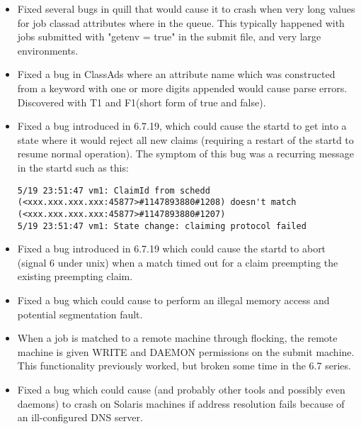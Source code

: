\begin{itemize}

\item Fixed several bugs in quill that would cause it to crash when
very long values for job classad attributes where in the queue.  This
typically happened with jobs submitted with "getenv = true" in the
submit file, and very large environments.

\item Fixed a bug in ClassAds where an attribute name which was
constructed from a keyword with one or more digits appended would
cause parse errors. Discovered with T1 and F1(short form of true
and false).

\item Fixed a bug introduced in 6.7.19, which could cause the startd
to get into a state where it would reject all new claims (requiring a
restart of the startd to resume normal operation).  The symptom of
this bug was a recurring message in the startd such as this:

\begin{verbatim}
5/19 23:51:47 vm1: ClaimId from schedd (<xxx.xxx.xxx.xxx:45877>#1147893880#1208) doesn't match (<xxx.xxx.xxx.xxx:45877>#1147893880#1207)
5/19 23:51:47 vm1: State change: claiming protocol failed
\end{verbatim}

\item Fixed a bug introduced in 6.7.19 which could cause the startd to
abort (signal 6 under unix) when a match timed out for a claim
preempting the existing preempting claim.

\item Fixed a bug which could cause  to perform an illegal
memory access and potential segmentation fault.

\item When a job is matched to a remote machine through flocking,
the remote machine is given WRITE and DAEMON permissions on the
submit machine.  This functionality previously worked, but broken
some time in the 6.7 series.

\item Fixed a bug which could cause  (and probably
other tools and possibly even daemons) to crash on Solaris machines
if address resolution fails because of an ill-configured DNS server.


\end{itemize}
